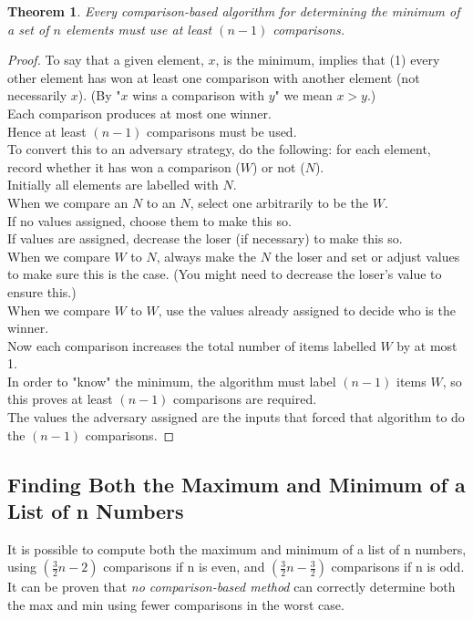 \documentclass[12pt]{article}
\theoremstyle{plain}
\newtheorem{theorem}{Theorem}[subsection]
\theoremstyle{definition}
\begin{document}
\begin{theorem}
Every comparison-based algorithm for determining the minimum of a set of $n$ elements must use at least $(n - 1)$ comparisons.
\end{theorem}
\begin{proof}
To say that a given element, $x$, is the minimum, implies that (1) every other element has won at least one comparison with another element (not necessarily $x$). (By "$x$ wins a comparison with $y$" we mean $x > y$.) \\
Each comparison produces at most one winner. \\
Hence at least $(n - 1)$ comparisons must be used. \\

To convert this to an adversary strategy, do the following: for each element, record whether it has won a comparison ($W$) or not ($N$). \\
Initially all elements are labelled with $N$. \\
When we compare an $N$ to an $N$, select one arbitrarily to be the $W$. \\
If no values assigned, choose them to make this so. \\
If values are assigned, decrease the loser (if necessary) to make this so. \\
When we compare $W$ to $N$, always make the $N$ the loser and set or adjust values to make sure this is the case. (You might need to decrease the loser's value to ensure this.) \\
When we compare $W$ to $W$, use the values already assigned to decide who is the winner. \\

Now each comparison increases the total number of items labelled $W$ by at most 1. \\
In order to "know" the minimum, the algorithm must label $(n - 1)$ items $W$, so this proves at least $(n - 1)$ comparisons are required. \\
The values the adversary assigned are the inputs that forced that algorithm to do the $(n - 1)$ comparisons.
\end{proof}

\subsection{Finding Both the Maximum and Minimum of a List of n Numbers}
It is possible to compute both the maximum and minimum of a list of n numbers, using $(\frac{3}{2}n - 2)$ comparisons if n is even, and $(\frac{3}{2}n - \frac{3}{2})$ comparisons if n is odd. \\
It can be proven that \emph{no comparison-based method} can correctly determine both the max and min using fewer comparisons in the worst case. \\
\end{document}
